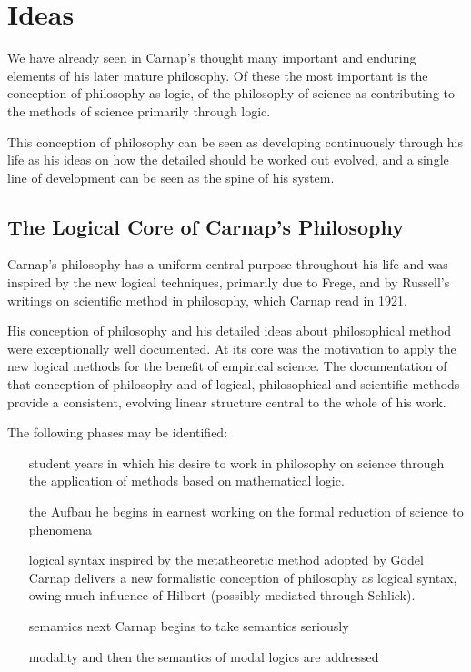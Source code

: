 \documentclass[10pt,titlepage]{book}
\def\ouml{\"o}
\begin{document}
\section{Ideas}

We have already seen in Carnap's thought many important and enduring elements of his later mature philosophy.
Of these the most important is the conception of philosophy as logic, of the philosophy of science as contributing to the methods of science primarily through logic.

This conception of philosophy can be seen as developing continuously through his life as his ideas on how the detailed should be worked out evolved, and a single line of development can be seen as the spine of his system.

\subsection{The Logical Core of Carnap's Philosophy}

Carnap's philosophy has a uniform central purpose throughout his life and was inspired by the new logical techniques, primarily due to Frege, and by Russell's writings on scientific method in philosophy, which Carnap read in 1921.

His conception of philosophy and his detailed ideas about philosophical method were exceptionally well documented.
At its core was the motivation to apply the new logical methods for the benefit of empirical science.
The documentation of that conception of philosophy and of logical, philosophical and scientific methods provide a consistent, evolving linear structure central to the whole of his work.

The following phases may be identified:

\begin{itemize}
\item[student years] in which his desire to work in philosophy on science through the application of methods based on mathematical logic.
\item[the Aufbau] he begins in earnest working on the formal reduction of science to phenomena
\item[logical syntax] inspired by the metatheoretic method adopted by G{\ouml}del Carnap delivers a new formalistic conception of philosophy as logical syntax, owing much influence of Hilbert (possibly mediated through Schlick).
\item[semantics] next Carnap begins to take semantics seriously
\item[modality] and then the semantics of modal logics are addressed
\end{itemize}
\end{document}
